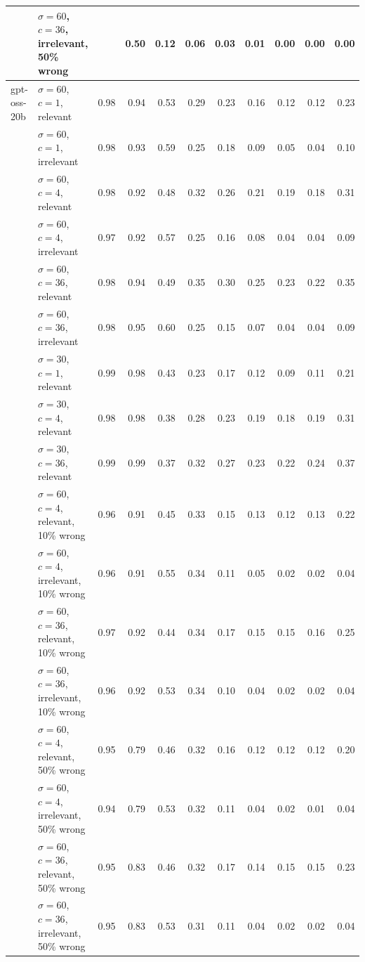 \begin{tabular}{llrrrrrrrrr}
 & $\sigma = 60$, $c = 36$, irrelevant, 50\% wrong &  & 0.50 & 0.12 & 0.06 & 0.03 & 0.01 & 0.00 & 0.00 & 0.00 \\
\midrule
gpt-oss-20b & $\sigma = 60$, $c = 1$, relevant & 0.98 & 0.94 & 0.53 & 0.29 & 0.23 & 0.16 & 0.12 & 0.12 & 0.23 \\
 & $\sigma = 60$, $c = 1$, irrelevant & 0.98 & 0.93 & 0.59 & 0.25 & 0.18 & 0.09 & 0.05 & 0.04 & 0.10 \\
 & $\sigma = 60$, $c = 4$, relevant & 0.98 & 0.92 & 0.48 & 0.32 & 0.26 & 0.21 & 0.19 & 0.18 & 0.31 \\
 & $\sigma = 60$, $c = 4$, irrelevant & 0.97 & 0.92 & 0.57 & 0.25 & 0.16 & 0.08 & 0.04 & 0.04 & 0.09 \\
 & $\sigma = 60$, $c = 36$, relevant & 0.98 & 0.94 & 0.49 & 0.35 & 0.30 & 0.25 & 0.23 & 0.22 & 0.35 \\
 & $\sigma = 60$, $c = 36$, irrelevant & 0.98 & 0.95 & 0.60 & 0.25 & 0.15 & 0.07 & 0.04 & 0.04 & 0.09 \\
 & $\sigma = 30$, $c = 1$, relevant & 0.99 & 0.98 & 0.43 & 0.23 & 0.17 & 0.12 & 0.09 & 0.11 & 0.21 \\
 & $\sigma = 30$, $c = 4$, relevant & 0.98 & 0.98 & 0.38 & 0.28 & 0.23 & 0.19 & 0.18 & 0.19 & 0.31 \\
 & $\sigma = 30$, $c = 36$, relevant & 0.99 & 0.99 & 0.37 & 0.32 & 0.27 & 0.23 & 0.22 & 0.24 & 0.37 \\
 & $\sigma = 60$, $c = 4$, relevant, 10\% wrong & 0.96 & 0.91 & 0.45 & 0.33 & 0.15 & 0.13 & 0.12 & 0.13 & 0.22 \\
 & $\sigma = 60$, $c = 4$, irrelevant, 10\% wrong & 0.96 & 0.91 & 0.55 & 0.34 & 0.11 & 0.05 & 0.02 & 0.02 & 0.04 \\
 & $\sigma = 60$, $c = 36$, relevant, 10\% wrong & 0.97 & 0.92 & 0.44 & 0.34 & 0.17 & 0.15 & 0.15 & 0.16 & 0.25 \\
 & $\sigma = 60$, $c = 36$, irrelevant, 10\% wrong & 0.96 & 0.92 & 0.53 & 0.34 & 0.10 & 0.04 & 0.02 & 0.02 & 0.04 \\
 & $\sigma = 60$, $c = 4$, relevant, 50\% wrong & 0.95 & 0.79 & 0.46 & 0.32 & 0.16 & 0.12 & 0.12 & 0.12 & 0.20 \\
 & $\sigma = 60$, $c = 4$, irrelevant, 50\% wrong & 0.94 & 0.79 & 0.53 & 0.32 & 0.11 & 0.04 & 0.02 & 0.01 & 0.04 \\
 & $\sigma = 60$, $c = 36$, relevant, 50\% wrong & 0.95 & 0.83 & 0.46 & 0.32 & 0.17 & 0.14 & 0.15 & 0.15 & 0.23 \\
 & $\sigma = 60$, $c = 36$, irrelevant, 50\% wrong & 0.95 & 0.83 & 0.53 & 0.31 & 0.11 & 0.04 & 0.02 & 0.02 & 0.04 \\

\end{tabular}

